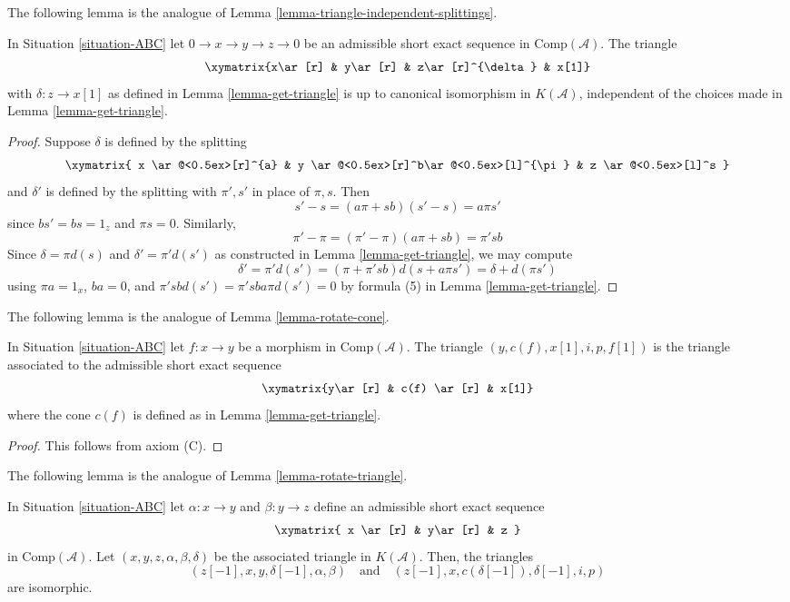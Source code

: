 \noindent
The following lemma is the analogue of
Lemma \ref{lemma-triangle-independent-splittings}.

\begin{lemma}
\label{lemma-analogue-triangle-independent-splittings}
In Situation \ref{situation-ABC}
let $0 \to x \to y \to z \to 0$ be an admissible short
exact sequence in $\text{Comp}(\mathcal{A})$. The triangle
$$
\xymatrix{x\ar[r] & y\ar[r] & z\ar[r]^{\delta} & x[1]}
$$
with $\delta : z \to x[1]$ as defined in Lemma \ref{lemma-get-triangle}
is up to canonical isomorphism in $K(\mathcal{A})$, independent of the
choices made in Lemma \ref{lemma-get-triangle}.
\end{lemma}

\begin{proof}
Suppose $\delta$ is defined by the splitting
$$
\xymatrix{
x \ar@<0.5ex>[r]^{a} &
y \ar@<0.5ex>[r]^b\ar@<0.5ex>[l]^{\pi} &
z \ar@<0.5ex>[l]^s
}
$$
and $\delta'$ is defined by the splitting with $\pi',s'$
in place of $\pi,s$. Then
$$
s'-s = (a\pi + sb)(s'-s) = a\pi s'
$$
since $bs' = bs = 1_z$ and $\pi s = 0$. Similarly,
$$
\pi' - \pi = (\pi' - \pi)(a\pi + sb) = \pi'sb
$$
Since $\delta = \pi d(s)$ and $\delta' = \pi'd(s')$
as constructed in Lemma \ref{lemma-get-triangle}, we may compute
$$
\delta' = \pi'd(s') = (\pi + \pi'sb)d(s + a\pi s') = \delta + d(\pi s')
$$
using $\pi a = 1_x$, $ba = 0$, and $\pi'sbd(s') = \pi'sba\pi d(s') = 0$
by formula (5) in Lemma \ref{lemma-get-triangle}.
\end{proof}

\noindent
The following lemma is the analogue of Lemma \ref{lemma-rotate-cone}.

\begin{lemma}
\label{lemma-restate-axiom-c}
In Situation \ref{situation-ABC}
let $f: x \to y$ be a morphism in $\text{Comp}(\mathcal{A})$.
The triangle $(y, c(f), x[1], i, p, f[1])$ is the triangle associated
to the admissible short exact sequence 
$$
\xymatrix{y\ar[r] & c(f) \ar[r] & x[1]}
$$
where the cone $c(f)$ is defined as in Lemma \ref{lemma-get-triangle}.
\end{lemma}

\begin{proof}
This follows from axiom (C).
\end{proof}

\noindent
The following lemma is the analogue of Lemma \ref{lemma-rotate-triangle}.

\begin{lemma}
\label{lemma-cone-rotate-isom}
In Situation \ref{situation-ABC} let $\alpha : x \to y$ and $\beta : y \to z$
define an admissible short exact sequence
$$
\xymatrix{
x \ar[r] &
y\ar[r] &
z
}
$$
in $\text{Comp}(\mathcal{A})$. Let $(x, y, z, \alpha, \beta, \delta)$
be the associated triangle in $K(\mathcal{A})$. Then, the triangles
$$
(z[-1], x, y, \delta[-1], \alpha, \beta)
\quad\text{and}\quad
(z[-1], x, c(\delta[-1]), \delta[-1], i, p)
$$
are isomorphic. 
\end{lemma}


